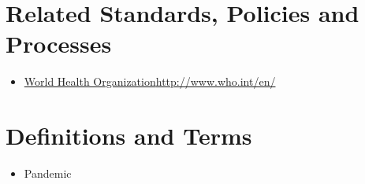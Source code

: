 \section{Related Standards, Policies and Processes}
\begin{itemize}
\item\href{http://www.who.int/en/}{World Health Organization}\newline\url{http://www.who.int/en/}
\end{itemize}
\section{Definitions and Terms}
\CommonDefinitionsAndTerms
\begin{itemize}
\item Pandemic
\end{itemize}
\CommonRevisionHistory